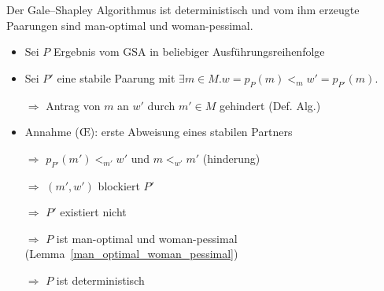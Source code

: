 \begin{frame}
  \begin{Theorem}
  \label{mann_optimal}
    Der Gale–Shapley Algorithmus ist deterministisch und vom ihm erzeugte Paarungen sind man-optimal und woman-pessimal.
  \end{Theorem}

  \begin{Beweis}
  \label{mann_optimal_bew}
    \begin{itemize} [<+->]
        \item Sei $P$ Ergebnis vom GSA in beliebiger Ausführungsreihenfolge
        \item Sei $P'$ eine stabile Paarung mit $\exists m \in M.w = p_{P}(m) <_{m} w' = p_{P'}(m)$.
        \item[$\Longrightarrow$] Antrag von $m$ an $w'$ durch $m' \in M$ gehindert (Def. Alg.)
        \item Annahme (\OE): erste Abweisung eines stabilen Partners
        \item[$\Longrightarrow$] $p_{P'}(m') <_{m'} w'$ und $m <_{w'} m'$ (hinderung)
        \item[$\Longrightarrow$] $(m',w')$ blockiert $P'$
        \item[$\Longrightarrow$] $P'$ existiert nicht
        \item[$\Longrightarrow$] $P$ ist man-optimal und woman-pessimal (Lemma~\ref{man_optimal_woman_pessimal})
        \item[$\Longrightarrow$] $P$ ist deterministisch
     \end{itemize}
  \end{Beweis}
\end{frame}
